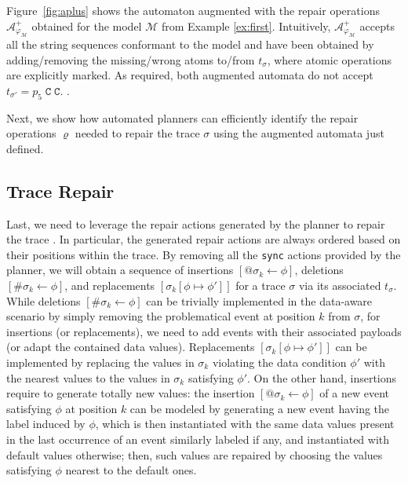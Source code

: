 Figure~\ref{fig:aplus} shows the automaton augmented with the repair operations $\mathcal{A}_{\varphi_{\mathcal{M}}}^+$ obtained for the model $\mathcal{M}$ from Example \ref{ex:first}. Intuitively, $\mathcal{A}_{\varphi_{\mathcal{M}}}^+$ accepts all the string sequences conformant to the model and have been obtained by adding/removing the missing/wrong atoms to/from $t_\sigma$, where atomic operations are explicitly marked. As required, both augmented automata do not accept $t_{\sigma'}=p_5\;\texttt{C}\;\texttt{C}$. . 

Next, we show how automated planners can efficiently identify the repair operations $\varrho$ needed to repair the trace $\sigma$ using the augmented automata just defined.




\subsection{Trace Repair}\label{ssec:trerepair}


Last, we need to leverage the repair actions generated by the planner to repair the  trace . In particular, the generated repair actions are always ordered based on their positions within the trace. By removing all the \texttt{sync} actions provided by the planner, we will obtain a sequence of insertions $[@\sigma_k\leftarrow \phi]$, deletions $[\#\sigma_k\leftarrow \phi]$, and replacements $[\sigma_k[\phi\mapsto \phi']]$ for a trace $\sigma$ via its associated $t_\sigma$. While deletions $[\#\sigma_k\leftarrow \phi]$ can be trivially implemented in the data-aware scenario by simply removing the problematical event at position $k$ from $\sigma$, for insertions (or replacements), we need to add events with their associated payloads (or adapt the contained data values). Replacements $[\sigma_k[\phi\mapsto \phi']]$ can be implemented by replacing the values in $\sigma_k$ violating the data condition $\phi'$ with the nearest values to the values in $\sigma_k$ satisfying $\phi'$. On the other hand, insertions require to generate totally new values: the insertion $[@\sigma_k\leftarrow \phi]$ of a new event satisfying $\phi$ at position $k$ can be modeled by generating a new event having the label induced by $\phi$, which is then instantiated with the same data values present in the last occurrence of an event similarly labeled if any, and instantiated with default values otherwise; then, such values are repaired by choosing the values satisfying $\phi$ nearest to the default ones.

